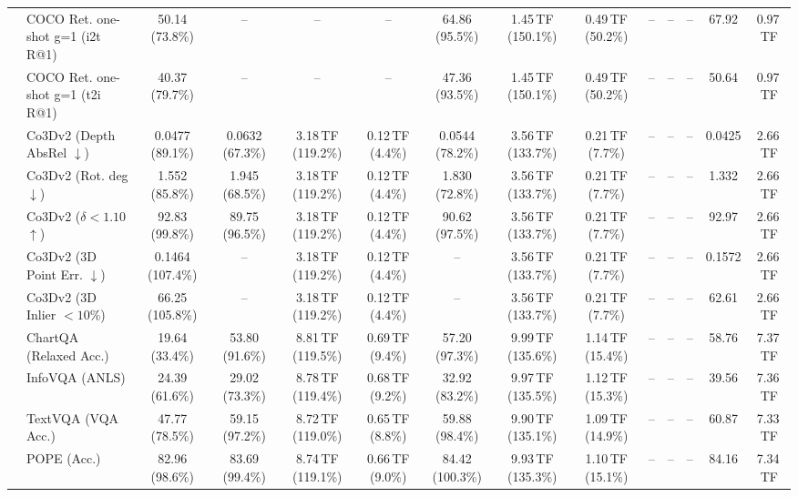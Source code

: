 \begin{table}[t]
\begin{center}
\begin{small}
\begin{sc}
{\begin{tabular}{llcccccccccccc}
& COCO Ret. one-shot g=1 (i2t R@1) & 50.14 (73.8\%) & -- & -- & -- & 64.86 (95.5\%) & 1.45\,TF (150.1\%) & 0.49\,TF (50.2\%) & -- & -- & -- & 67.92 & 0.97\,TF \\
& COCO Ret. one-shot g=1 (t2i R@1) & 40.37 (79.7\%) & -- & -- & -- & 47.36 (93.5\%) & 1.45\,TF (150.1\%) & 0.49\,TF (50.2\%) & -- & -- & -- & 50.64 & 0.97\,TF \\
\midrule
{}
& Co3Dv2 (Depth AbsRel $\downarrow$) & 0.0477 (89.1\%) & 0.0632 (67.3\%) & 3.18\,TF (119.2\%) & 0.12\,TF (4.4\%) & 0.0544 (78.2\%) & 3.56\,TF (133.7\%) & 0.21\,TF (7.7\%) & -- & -- & -- & 0.0425 & 2.66\,TF \\
& Co3Dv2 (Rot. deg $\downarrow$) & 1.552 (85.8\%) & 1.945 (68.5\%) & 3.18\,TF (119.2\%) & 0.12\,TF (4.4\%) & 1.830 (72.8\%) & 3.56\,TF (133.7\%) & 0.21\,TF (7.7\%) & -- & -- & -- & 1.332 & 2.66\,TF \\
& Co3Dv2 ($\delta < 1.10$ $\uparrow$) & 92.83 (99.8\%) & 89.75 (96.5\%) & 3.18\,TF (119.2\%) & 0.12\,TF (4.4\%) & 90.62 (97.5\%) & 3.56\,TF (133.7\%) & 0.21\,TF (7.7\%) & -- & -- & -- & 92.97 & 2.66\,TF \\
& Co3Dv2 (3D Point Err. $\downarrow$) & 0.1464 (107.4\%) & -- & 3.18\,TF (119.2\%) & 0.12\,TF (4.4\%) & -- & 3.56\,TF (133.7\%) & 0.21\,TF (7.7\%) & -- & -- & -- & 0.1572 & 2.66\,TF \\
& Co3Dv2 (3D Inlier $<10\%$) & 66.25 (105.8\%) & -- & 3.18\,TF (119.2\%) & 0.12\,TF (4.4\%) & -- & 3.56\,TF (133.7\%) & 0.21\,TF (7.7\%) & -- & -- & -- & 62.61 & 2.66\,TF \\
\midrule\midrule
{}
& ChartQA (Relaxed Acc.) & 19.64 (33.4\%) & 53.80 (91.6\%) & 8.81\,TF (119.5\%) & 0.69\,TF (9.4\%) & 57.20 (97.3\%) & 9.99\,TF (135.6\%) & 1.14\,TF (15.4\%) & -- & -- & -- & 58.76 & 7.37\,TF \\
& InfoVQA (ANLS) & 24.39 (61.6\%) & 29.02 (73.3\%) & 8.78\,TF (119.4\%) & 0.68\,TF (9.2\%) & 32.92 (83.2\%) & 9.97\,TF (135.5\%) & 1.12\,TF (15.3\%) & -- & -- & -- & 39.56 & 7.36\,TF \\
& TextVQA (VQA Acc.) & 47.77 (78.5\%) & 59.15 (97.2\%) & 8.72\,TF (119.0\%) & 0.65\,TF (8.8\%) & 59.88 (98.4\%) & 9.90\,TF (135.1\%) & 1.09\,TF (14.9\%) & -- & -- & -- & 60.87 & 7.33\,TF \\
& POPE (Acc.) & 82.96 (98.6\%) & 83.69 (99.4\%) & 8.74\,TF (119.1\%) & 0.66\,TF (9.0\%) & 84.42 (100.3\%) & 9.93\,TF (135.3\%) & 1.10\,TF (15.1\%) & -- & -- & -- & 84.16 & 7.34\,TF \\

\end{tabular}}
\end{sc}
\end{small}
\end{center}
\end{table}
